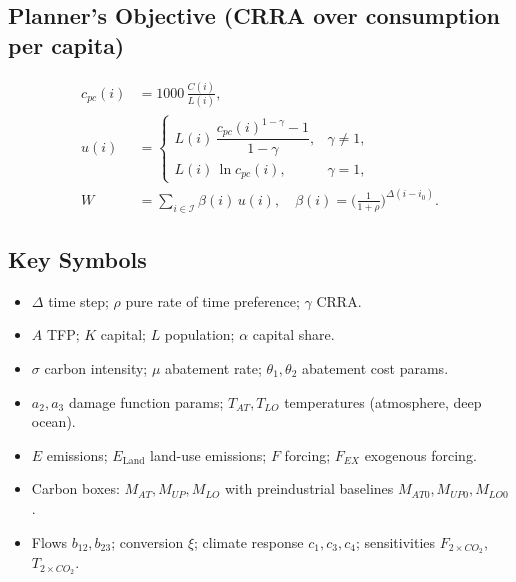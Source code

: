 \documentclass[11pt]{scrartcl}%
\theoremstyle{mytheoremstyle}
\theoremstyle{plain}
\begin{document}
\subsection*{Planner's Objective (CRRA over consumption per capita)}%

\begin{align}
c_{pc}(i)  & = 1000\,\frac{C(i)}{L(i)},\\
u(i)  & =
\begin{cases}
L(i)\,\dfrac{c_{pc}(i)^{1-\gamma}-1}{1-\gamma}, & \gamma\neq1,\\[6pt]%
L(i)\,\ln c_{pc}(i), & \gamma= 1,
\end{cases}
\\
W  & = \sum_{i \in\mathcal{I}} \beta(i)\,u(i), \quad\beta(i)=\Big(\tfrac
{1}{1+\rho}\Big)^{\Delta(i-i_{0})}.
\end{align}


\subsection*{Key Symbols}

\begin{itemize}
\item $\Delta$ time step; $\rho$ pure rate of time preference; $\gamma$ CRRA.

\item $A$ TFP; $K$ capital; $L$ population; $\alpha$ capital share.

\item $\sigma$ carbon intensity; $\mu$ abatement rate; $\theta_{1},\theta_{2}$
abatement cost params.

\item $a_{2},a_{3}$ damage function params; $T_{AT},T_{LO}$ temperatures
(atmosphere, deep ocean).

\item $E$ emissions; $E_{\text{Land}}$ land-use emissions; $F$ forcing;
$F_{EX}$ exogenous forcing.

\item Carbon boxes: $M_{AT},M_{UP},M_{LO}$ with preindustrial baselines
$M_{AT0},M_{UP0},M_{LO0}$.

\item Flows $b_{12},b_{23}$; conversion $\xi$; climate response $c_{1}%
,c_{3},c_{4}$; sensitivities $F_{2\times CO_{2}}$, $T_{2\times CO_{2}}$.
\end{itemize}
\end{document}
